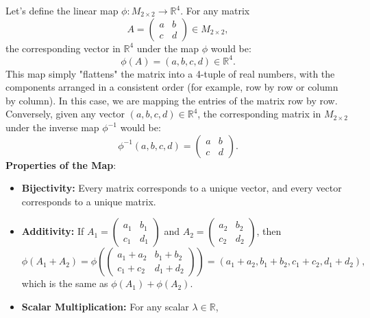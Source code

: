 \documentclass{report}
\begin{document}
\begin{itemize}
            \bigbreak \noindent 
            Let’s define the linear map $\phi: M_{2 \times 2} \to \mathbb{R}^4$.
            \bigbreak \noindent 
            For any matrix
            \[
                A = \begin{pmatrix}
                    a & b \\
                    c & d
                \end{pmatrix} \in M_{2 \times 2},
            \]
            the corresponding vector in $\mathbb{R}^4$ under the map $\phi$ would be:
            \[
                \phi(A) = (a, b, c, d) \in \mathbb{R}^4.
            \]
            This map simply "flattens" the matrix into a 4-tuple of real numbers, with the components arranged in a consistent order (for example, row by row or column by column). In this case, we are mapping the entries of the matrix row by row.
            \bigbreak \noindent 
            Conversely, given any vector $(a, b, c, d) \in \mathbb{R}^4$, the corresponding matrix in $M_{2 \times 2}$ under the inverse map $\phi^{-1}$ would be:
            \[
                \phi^{-1}(a, b, c, d) = \begin{pmatrix}
                    a & b \\
                    c & d
                \end{pmatrix}.
            \]
            \textbf{Properties of the Map}:
            \begin{itemize}
                \item \textbf{Bijectivity:} Every matrix corresponds to a unique vector, and every vector corresponds to a unique matrix.
                \item \textbf{Additivity:} If $A_1 = \begin{pmatrix} a_1 & b_1 \\ c_1 & d_1 \end{pmatrix}$ and $A_2 = \begin{pmatrix} a_2 & b_2 \\ c_2 & d_2 \end{pmatrix}$, then
                    \[
                        \phi(A_1 + A_2) = \phi\left(\begin{pmatrix} a_1 + a_2 & b_1 + b_2 \\ c_1 + c_2 & d_1 + d_2 \end{pmatrix}\right) = (a_1 + a_2, b_1 + b_2, c_1 + c_2, d_1 + d_2),
                    \]
                    which is the same as $\phi(A_1) + \phi(A_2)$.
                \item  \textbf{Scalar Multiplication:} For any scalar $\lambda \in \mathbb{R}$,

\end{itemize}
\end{itemize}
\end{document}
